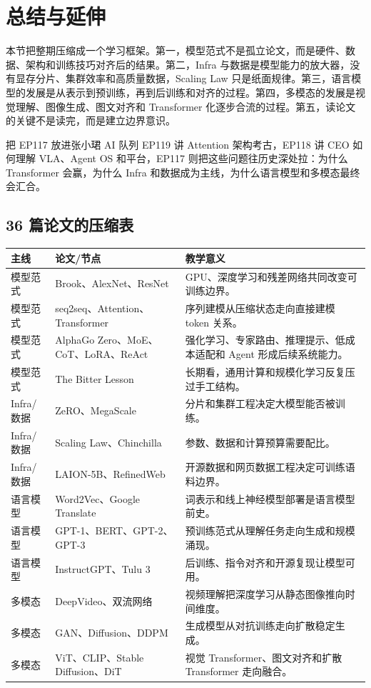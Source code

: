 \section{总结与延伸}

本节把整期压缩成一个学习框架。第一，模型范式不是孤立论文，而是硬件、数据、架构和训练技巧对齐后的结果。第二，Infra 与数据是模型能力的放大器，没有显存分片、集群效率和高质量数据，Scaling Law 只是纸面规律。第三，语言模型的发展是从表示到预训练，再到后训练和对齐的过程。第四，多模态的发展是视觉理解、图像生成、图文对齐和 Transformer 化逐步合流的过程。第五，读论文的关键不是读完，而是建立边界意识。

\begin{importantbox}{把 EP117 放进张小珺 AI 队列}
EP119 讲 Attention 架构考古，EP118 讲 CEO 如何理解 VLA、Agent OS 和平台，EP117 则把这些问题往历史深处拉：为什么 Transformer 会赢，为什么 Infra 和数据成为主线，为什么语言模型和多模态最终会汇合。
\end{importantbox}

\subsection{36 篇论文的压缩表}

\begin{longtable}{p{}p{}p{}}
\toprule
主线 & 论文/节点 & 教学意义 \\
\midrule
模型范式 & Brook、AlexNet、ResNet & GPU、深度学习和残差网络共同改变可训练边界。 \\
模型范式 & seq2seq、Attention、Transformer & 序列建模从压缩状态走向直接建模 token 关系。 \\
模型范式 & AlphaGo Zero、MoE、CoT、LoRA、ReAct & 强化学习、专家路由、推理提示、低成本适配和 Agent 形成后续系统能力。 \\
模型范式 & The Bitter Lesson & 长期看，通用计算和规模化学习反复压过手工结构。 \\
Infra/数据 & ZeRO、MegaScale & 分片和集群工程决定大模型能否被训练。 \\
Infra/数据 & Scaling Law、Chinchilla & 参数、数据和计算预算需要配比。 \\
Infra/数据 & LAION-5B、RefinedWeb & 开源数据和网页数据工程决定可训练语料边界。 \\
语言模型 & Word2Vec、Google Translate & 词表示和线上神经模型部署是语言模型前史。 \\
语言模型 & GPT-1、BERT、GPT-2、GPT-3 & 预训练范式从理解任务走向生成和规模涌现。 \\
语言模型 & InstructGPT、Tulu 3 & 后训练、指令对齐和开源复现让模型可用。 \\
多模态 & DeepVideo、双流网络 & 视频理解把深度学习从静态图像推向时间维度。 \\
多模态 & GAN、Diffusion、DDPM & 生成模型从对抗训练走向扩散稳定生成。 \\
多模态 & ViT、CLIP、Stable Diffusion、DiT & 视觉 Transformer、图文对齐和扩散 Transformer 走向融合。 \\
\bottomrule
\end{longtable}

